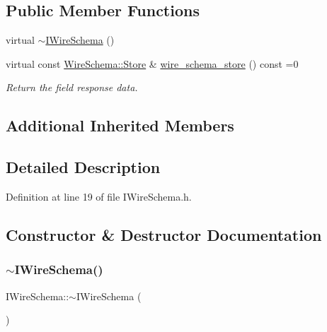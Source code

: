 \subsection*{Public Member Functions}
\begin{DoxyCompactItemize}
\item 
virtual \hyperlink{class_wire_cell_1_1_i_wire_schema_ad0688ea7817967a145e7667527430f35}{$\sim$\+I\+Wire\+Schema} ()
\item 
virtual const \hyperlink{class_wire_cell_1_1_wire_schema_1_1_store}{Wire\+Schema\+::\+Store} \& \hyperlink{class_wire_cell_1_1_i_wire_schema_a054538cf0ab8dbfd7b5d2a0064304c08}{wire\+\_\+schema\+\_\+store} () const =0
\begin{DoxyCompactList}\small\item\em Return the field response data. \end{DoxyCompactList}\end{DoxyCompactItemize}
\subsection*{Additional Inherited Members}


\subsection{Detailed Description}


Definition at line 19 of file I\+Wire\+Schema.\+h.



\subsection{Constructor \& Destructor Documentation}
\mbox{\label{class_wire_cell_1_1_i_wire_schema_ad0688ea7817967a145e7667527430f35}} 
\subsubsection{\texorpdfstring{$\sim$\+I\+Wire\+Schema()}{~IWireSchema()}}
{\footnotesize\ttfamily I\+Wire\+Schema\+::$\sim$\+I\+Wire\+Schema (\begin{DoxyParamCaption}{ }\end{DoxyParamCaption})\hspace{0.3cm}{\ttfamily [virtual]}}



